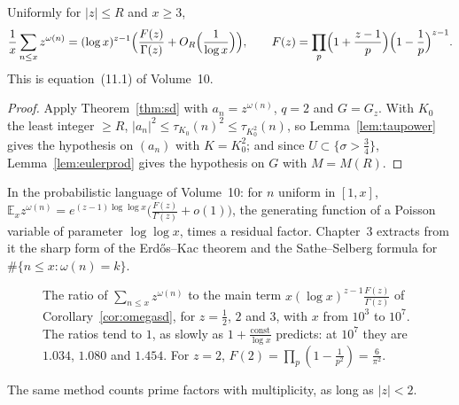 \begin{corollary}[Selberg, 1954]\label{cor:omegasd}
Uniformly for $|z|\le R$ and $x\ge3$,
\[
\frac1x\sum_{n\le x}z^{\omega(n)}=(\log x)^{z-1}\Bigl(\frac{F(z)}{\Gamma(z)}+O_R\Bigl(\frac1{\log x}\Bigr)\Bigr),\qquad F(z)=\prod_p\Bigl(1+\frac{z-1}p\Bigr)\Bigl(1-\frac1p\Bigr)^{z-1}.
\]
This is equation~(11.1) of Volume~10.
\end{corollary}
\begin{proof}
Apply Theorem~\ref{thm:sd} with $a_n=z^{\omega(n)}$, $q=2$ and $G=G_z$. With $K_0$ the least integer $\ge R$, $|a_n|^2\le\tau_{K_0}(n)^2\le\tau_{K_0^2}(n)$, so Lemma~\ref{lem:taupower} gives the hypothesis on $(a_n)$ with $K=K_0^2$; and since $U\subset\{\sigma>\frac34\}$, Lemma~\ref{lem:eulerprod} gives the hypothesis on $G$ with $M=M(R)$.
\end{proof}

In the probabilistic language of Volume~10: for $n$ uniform in $[1,x]$, $\mathbb E_xz^{\omega(n)}=e^{(z-1)\log\log x}\bigl(\frac{F(z)}{\Gamma(z)}+o(1)\bigr)$, the generating function of a Poisson variable of parameter $\log\log x$, times a residual factor. Chapter~3 extracts from it the sharp form of the Erd\H{o}s--Kac theorem and the Sathe--Selberg formula for $\#\{n\le x:\omega(n)=k\}$.

\begin{figure}[ht]
\centering{}
\caption{The ratio of $\sum_{n\le x}z^{\omega(n)}$ to the main term $x(\log x)^{z-1}\frac{F(z)}{\Gamma(z)}$ of Corollary~\ref{cor:omegasd}, for $z=\frac12$, $2$ and $3$, with $x$ from $10^3$ to $10^7$. The ratios tend to $1$, as slowly as $1+\frac{\text{const}}{\log x}$ predicts: at $10^7$ they are $1.034$, $1.080$ and $1.454$. For $z=2$, $F(2)=\prod_p(1-\frac1{p^2})=\frac6{\pi^2}$.}
\label{fig:sdratio}
\end{figure}

The same method counts prime factors with multiplicity, as long as $|z|<2$.

